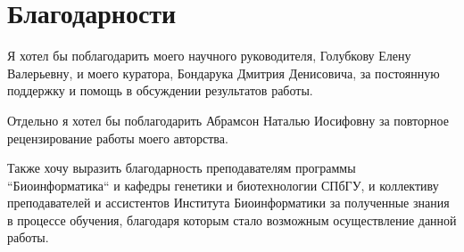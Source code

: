 \clearpage
\section{Благодарности}

Я хотел бы поблагодарить моего научного руководителя, Голубкову Елену Валерьевну, и моего куратора, Бондарука Дмитрия Денисовича, за постоянную поддержку и помощь в обсуждении результатов работы.

Отдельно я хотел бы поблагодарить Абрамсон Наталью Иосифовну за повторное рецензирование работы моего авторства.

Также хочу выразить благодарность преподавателям программы ``Биоинформатика`` и кафедры генетики и биотехнологии СПбГУ, и коллективу преподавателей и ассистентов Института Биоинформатики за полученные знания в процессе обучения, благодаря которым стало возможным осуществление данной работы.